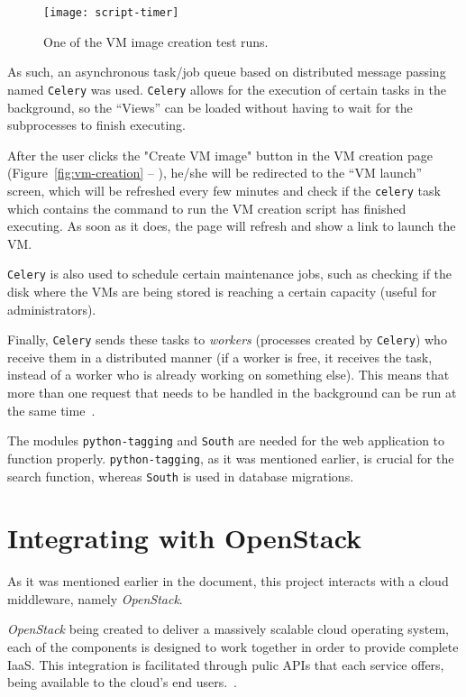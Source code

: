 \begin{figure}[h]
  \begin{center}
    \leavevmode
    \texttt{[image: script-timer]}
    \caption{One of the VM image creation test runs.}
    \label{fig:script-timer}
  \end{center}
\end{figure}

As such, an asynchronous task/job queue based on distributed message passing named \texttt{Celery} was used. \texttt{Celery} allows for the execution of certain tasks in the background, so the ``Views'' can be loaded without having to wait for the subprocesses to finish executing.

After the user clicks the "Create VM image" button in the VM creation page (Figure~\ref{fig:vm-creation} -- ), he/she will be redirected to the ``VM launch'' screen, which will be refreshed every few minutes and check if the \texttt{celery} task which contains the command to run the VM creation script has finished executing. As soon as it does, the page will refresh and show a link to launch the VM.

\texttt{Celery} is also used to schedule certain maintenance jobs, such as checking if the disk where the VMs are being stored is reaching a certain capacity (useful for administrators).

Finally, \texttt{Celery} sends these tasks to \textit{workers} (processes created by \texttt{Celery}) who receive them in a distributed manner (if a worker is free, it receives the task, instead of a worker who is already working on something else). This means that more than one request that needs to be handled in the background can be run at the same time~\cite{celery}.

The modules \texttt{python-tagging} and \texttt{South} are needed for the web application to function properly. \texttt{python-tagging}, as it was mentioned earlier, is crucial for the search function, whereas \texttt{South} is used in database migrations.

\section{Integrating with OpenStack}

As it was mentioned earlier in the document, this project interacts with a cloud middleware, namely \textit{OpenStack}.

\textit{OpenStack} being created to deliver a massively scalable cloud operating system, each of the components is designed to work together in order to provide complete IaaS. This integration is facilitated through pulic APIs that each service offers, being available to the cloud's end users.~\cite{ken-pepple:essex-arch}. 

